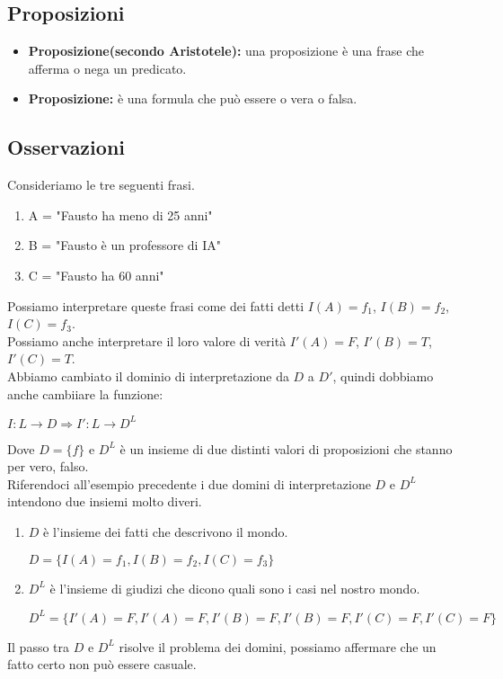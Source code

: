 \documentclass{book}
\begin{document}
    \subsection{Proposizioni}
    \begin{itemize}
        \item \textbf{Proposizione(secondo Aristotele):} una proposizione è una frase che afferma o nega un predicato.
        \item \textbf{Proposizione:} è una formula che può essere o vera o falsa.
    \end{itemize}

    \subsection{Osservazioni}
    Consideriamo le tre seguenti frasi.
    \begin{enumerate}
        \item A = "Fausto ha meno di 25 anni"
        \item B = "Fausto è un professore di IA"
        \item C = "Fausto ha 60 anni"
    \end{enumerate}
    Possiamo interpretare queste frasi come dei fatti detti $I(A)=f_1$, $I(B)=f_2$, $I(C)=f_3$.\\
    Possiamo anche interpretare il loro valore di verità $I\prime (A)=F$, $I\prime (B)=T$, $I\prime (C)=T$.\\
    Abbiamo cambiato il dominio di interpretazione da $D$ a $D\prime$, quindi dobbiamo anche cambiiare la funzione:
    \begin{center}
        $I:L \to D \Rightarrow I\prime:L \to D^L$
    \end{center}
    Dove $D=\{f\}$ e $D^L$ è un insieme di due distinti valori di proposizioni che stanno per vero, falso.\\
    Riferendoci all'esempio precedente i due domini di interpretazione $D$ e $D^L$ intendono due insiemi molto diveri.
    \begin{enumerate}
        \item $D$ è l'insieme dei fatti che descrivono il mondo.
            \begin{center}
                $D = \{I(A)=f_1, I(B)=f_2, I(C)=f_3\}$
            \end{center}
        \item $D^L$ è l'insieme di giudizi che dicono quali sono i casi nel nostro mondo.
            \begin{center}
                $D^L = \{I\prime(A)=F, I\prime(A)=F, I\prime(B)=F, I\prime(B)=F,I\prime(C)=F, I\prime(C)=F\}$
            \end{center}
    \end{enumerate}
    Il passo tra $D$ e $D^L$ risolve il problema dei domini, possiamo affermare che un fatto certo non può essere casuale.
\end{document}
